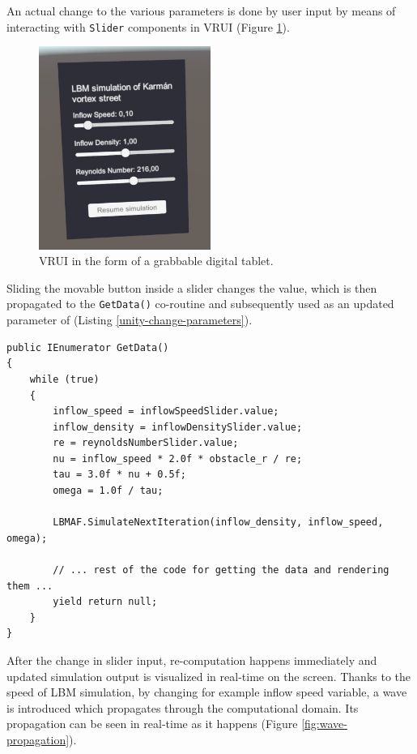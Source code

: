 An actual change to the various parameters is done by user input by means of interacting with \texttt{Slider} components in VRUI (Figure \ref{fig:vrui}).

\begin{figure}[!ht]
	\centering
	\includegraphics[width=0.5\textwidth]{figures/vrui.jpeg}
	\caption{VRUI in the form of a grabbable digital tablet.}
	\label{fig:vrui}
\end{figure}

Sliding the movable button inside a slider changes the value, which is then propagated to the \texttt{GetData()} co-routine and subsequently used as an updated parameter of  (Listing \ref{unity-change-parameters}).

\begin{lstlisting}[language=Csharp, caption=Implementation of the re-computing of the simulation each frame based on values from user input through VRUI (sliders)., label=unity-change-parameters]
public IEnumerator GetData()
{
	while (true)
	{
		inflow_speed = inflowSpeedSlider.value;
		inflow_density = inflowDensitySlider.value;
		re = reynoldsNumberSlider.value;
		nu = inflow_speed * 2.0f * obstacle_r / re;
		tau = 3.0f * nu + 0.5f;
		omega = 1.0f / tau;
		
		LBMAF.SimulateNextIteration(inflow_density, inflow_speed, omega);
		
		// ... rest of the code for getting the data and rendering them ...
		yield return null;
	}
}
\end{lstlisting}

After the change in slider input, re-computation happens immediately and updated simulation output is visualized in real-time on the screen. Thanks to the speed of LBM simulation, by changing for example inflow speed variable, a wave is introduced which propagates through the computational domain. Its propagation can be seen in real-time as it happens (Figure \ref{fig:wave-propagation}).

